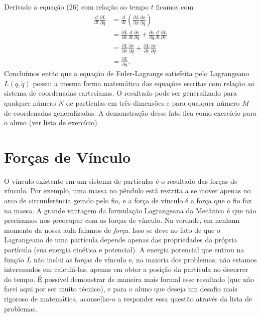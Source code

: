 \documentclass{article}
\begin{document}
Derivado a equação (26) com relação ao tempo $t$ ficamos com
\begin{equation}
    \begin{split}
        \frac{d}{dt}\frac{\partial L}{\partial \dot{q}} &= \frac{d}{dt}\left( \frac{\partial L}{\partial \dot{x}}\frac{\partial x}{\partial q} \right) \\
                                                        &=\frac{\partial L}{\partial \dot{x}}\frac{d}{dt}\frac{\partial x}{\partial q} + \frac{\partial x}{\partial q}\frac{d}{dt}\frac{\partial L}{\partial \dot{x}} \\
                                                        &= \frac{\partial L}{\partial \dot{x}}\frac{\partial \dot{x}}{\partial q} + \frac{\partial L}{\partial x}\frac{\partial x}{\partial q} \\
                                                        &=\frac{\partial L}{\partial q}.
    \end{split}
\end{equation}
Concluímos então que a equação de Euler-Lagrange satisfeita pelo Lagrangeano $L(q,\dot{q})$ possui a mesma forma matemática das equações escritas com relação ao sistema de coordenadas cartesianas. O resultado pode ser generalizado para qualquer número $N$ de partículas em três dimensões e para qualquer número $M$ de coordenadas generalizadas. A demonstração desse fato fica como exercício para o aluno (ver lista de exercício). 

\section{Forças de Vínculo}

O vínculo existente em um sistema de partículas é o resultado das forças de vínculo. Por exemplo, uma massa no pêndulo está restrita a se mover apenas no arco de circunferência gerado pelo fio, e a força de vínculo é a força que o fio faz na massa. A grande vantagem da formulação Lagrangeana da Mecânica é que não precisamos nos preocupar com as forças de vínculo. Na verdade, em nenhum momento da nossa aula falamos de \textit{força}. Isso se deve ao fato de que o Lagrangeano de uma partícula depende apenas das propriedades da própria partícula (sua energia cinética e potencial). A energia potencial que entrou na função $L$ não inclui as forças de vínculo e, na maioria dos problemas, não estamos interessados em calculá-las, apenas em obter a posição da partícula no decorrer do tempo. É possível demonstrar de maneira mais formal esse resultado (que não farei aqui por ser muito técnico), e para o aluno que deseja um desafio mais rigoroso de matemática, aconselho-o a responder essa questão através da lista de problemas. 
\end{document}
